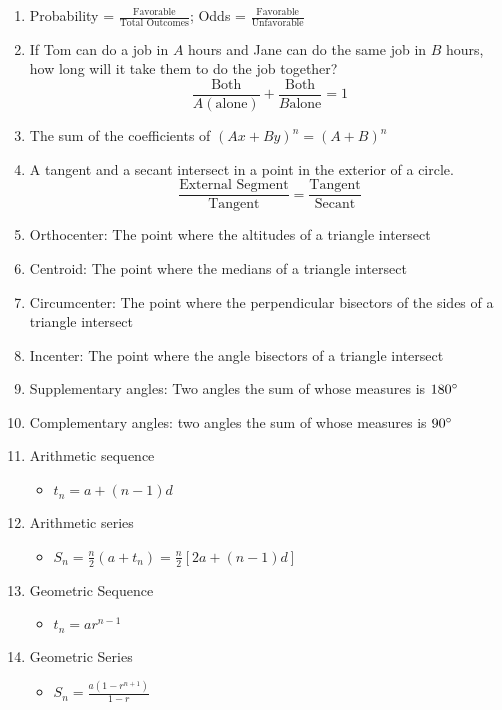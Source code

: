 \documentclass[../uilmath.tex]{subfiles}
\begin{document}
\begin{enumerate}
    \item Probability = $\frac{\text{Favorable}}{\text{Total Outcomes}}$; Odds = $\frac{\text{Favorable}}{\text{Unfavorable}}$
    \item If Tom can do a job in $A$ hours and Jane can do the same job in $B$ hours, how long will it take them to do the job together?
    \[ \frac{\text{Both}}{A(\text{alone})}+\frac{\text{Both}}{B\text{alone}}=1\]

    \item The sum of the coefficients of $(Ax+By)^n = (A+B)^n$
    \item A tangent and a secant intersect in a point in the exterior of a circle.
    \[ \frac{\text{External Segment}}{\text{Tangent}}=\frac{\text{Tangent}}{\text{Secant}}\]

    \item Orthocenter: The point where the altitudes of a triangle intersect 
    \item Centroid: The point where the medians of a triangle intersect 
    \item Circumcenter: The point where the perpendicular bisectors of the sides of a triangle intersect 
    \item Incenter: The point where the angle bisectors of a triangle intersect 
    \item Supplementary angles: Two angles the sum of whose measures is $180\degree$
    \item Complementary angles: two angles the sum of whose measures is $90\degree$
    \item Arithmetic sequence 
    \begin{itemize}
        \item $t_n=a+(n-1)d$
    \end{itemize}
    \item Arithmetic series 
    \begin{itemize}
        \item $S_n = \frac{n}{2}(a+t_n)=\frac{n}{2}[2a+(n-1)d]$
    \end{itemize}
    \item Geometric Sequence 
    \begin{itemize}
        \item $t_n=ar^{n-1}$
    \end{itemize}
    \item Geometric Series 
    \begin{itemize}
        \item $S_n = \frac{a(1-r^{n+1})}{1-r}$
    \end{itemize}

\end{enumerate}
\end{document}
